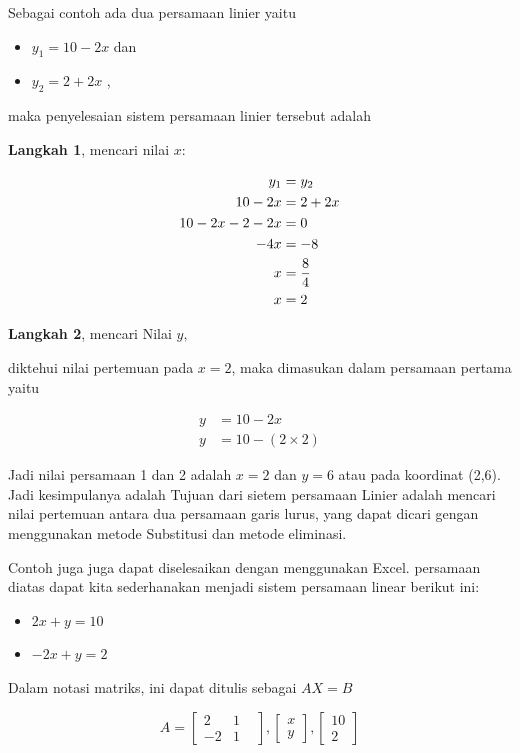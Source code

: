 \documentclass[
]{book}
\providecommand{\tightlist}{%
  \setlength{\itemsep}{0pt}\setlength{\parskip}{0pt}}
\begin{document}
Sebagai contoh ada dua persamaan linier yaitu

\begin{itemize}
\tightlist
\item
  \(y_1 = 10 -2x\) dan
\item
  \(y_2 = 2 + 2x\) ,
\end{itemize}

maka penyelesaian sistem persamaan linier tersebut adalah

\textbf{Langkah 1}, mencari nilai \(x:\)

\[
\begin{aligned}
y_1   &= y_2 \\
10-2x &= 2+2x\\
10-2x-2-2x &= 0 \\
-4x &= -8\\
x &= {8\over 4} \\
x &= 2 \\
\end{aligned}
\]

\textbf{Langkah 2}, mencari Nilai \(y,\)

diktehui nilai pertemuan pada \(x=2\), maka dimasukan dalam persamaan pertama yaitu

\[
\begin{aligned}
y &= 10-2x \\
y &= 10-(2 \times 2)
\end{aligned}
\]

Jadi nilai persamaan 1 dan 2 adalah \(x=2\) dan \(y=6\) atau pada koordinat (2,6). Jadi kesimpulanya adalah Tujuan dari sietem persamaan Linier adalah mencari nilai pertemuan antara dua persamaan garis lurus, yang dapat dicari gengan menggunakan metode Substitusi dan metode eliminasi.

Contoh juga juga dapat diselesaikan dengan menggunakan Excel. persamaan diatas dapat kita sederhanakan menjadi sistem persamaan linear berikut ini:

\begin{itemize}
\tightlist
\item
  \(2x + y = 10\)
\item
  \(-2x +y = 2\)
\end{itemize}

Dalam notasi matriks, ini dapat ditulis sebagai \(AX = B\)

\[ A=
\begin{bmatrix}
    2 & 1 &  \\
   -2 & 1 
\end{bmatrix}, 
\begin{bmatrix}
    x  \\
   y 
\end{bmatrix},
\begin{bmatrix}
    10  \\
   2 
\end{bmatrix}
\]
\end{document}
